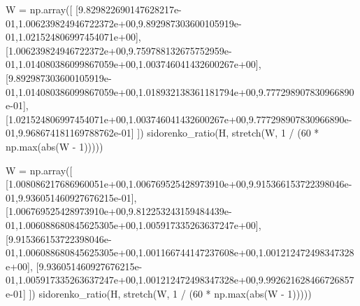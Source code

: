 \documentclass[
  letterpaper,
  DIV=11,
  numbers=noendperiod]{scrartcl}
\newenvironment{Shaded}{\begin{snugshade}}{\end{snugshade}}
\newcommand{\BuiltInTok}[1]{\textcolor[rgb]{0.00,0.23,0.31}{#1}}
\newcommand{\DecValTok}[1]{\textcolor[rgb]{0.68,0.00,0.00}{#1}}
\newcommand{\FloatTok}[1]{\textcolor[rgb]{0.68,0.00,0.00}{#1}}
\newcommand{\NormalTok}[1]{\textcolor[rgb]{0.00,0.23,0.31}{#1}}
\newcommand{\OperatorTok}[1]{\textcolor[rgb]{0.37,0.37,0.37}{#1}}
\begin{document}
\begin{Shaded}
\begin{Highlighting}[]
\NormalTok{W }\OperatorTok{=}\NormalTok{ np.array([}
\NormalTok{  [}\FloatTok{9.829822690147628217e{-}01}\NormalTok{,}\FloatTok{1.006239824946722372e+00}\NormalTok{,}\FloatTok{9.892987303600105919e{-}01}\NormalTok{,}\FloatTok{1.021524806997454071e+00}\NormalTok{],}
\NormalTok{[}\FloatTok{1.006239824946722372e+00}\NormalTok{,}\FloatTok{9.759788132675752959e{-}01}\NormalTok{,}\FloatTok{1.014080386099867059e+00}\NormalTok{,}\FloatTok{1.003746041432600267e+00}\NormalTok{],}
\NormalTok{[}\FloatTok{9.892987303600105919e{-}01}\NormalTok{,}\FloatTok{1.014080386099867059e+00}\NormalTok{,}\FloatTok{1.018932138361181794e+00}\NormalTok{,}\FloatTok{9.777298907830966890e{-}01}\NormalTok{],}
\NormalTok{[}\FloatTok{1.021524806997454071e+00}\NormalTok{,}\FloatTok{1.003746041432600267e+00}\NormalTok{,}\FloatTok{9.777298907830966890e{-}01}\NormalTok{,}\FloatTok{9.968674181169788762e{-}01}\NormalTok{]}
\NormalTok{])}
\NormalTok{sidorenko\_ratio(H, stretch(W, }\DecValTok{1} \OperatorTok{/}\NormalTok{ (}\DecValTok{60} \OperatorTok{*}\NormalTok{ np.}\BuiltInTok{max}\NormalTok{(}\BuiltInTok{abs}\NormalTok{(W }\OperatorTok{{-}} \DecValTok{1}\NormalTok{)))))}

\NormalTok{W }\OperatorTok{=}\NormalTok{ np.array([}
\NormalTok{[}\FloatTok{1.008086217686960051e+00}\NormalTok{,}\FloatTok{1.006769525428973910e+00}\NormalTok{,}\FloatTok{9.915366153722398046e{-}01}\NormalTok{,}\FloatTok{9.936051460927676215e{-}01}\NormalTok{],}
\NormalTok{[}\FloatTok{1.006769525428973910e+00}\NormalTok{,}\FloatTok{9.812253243159484439e{-}01}\NormalTok{,}\FloatTok{1.006088680845625305e+00}\NormalTok{,}\FloatTok{1.005917335263637247e+00}\NormalTok{],}
\NormalTok{[}\FloatTok{9.915366153722398046e{-}01}\NormalTok{,}\FloatTok{1.006088680845625305e+00}\NormalTok{,}\FloatTok{1.001166744147237608e+00}\NormalTok{,}\FloatTok{1.001212472498347328e+00}\NormalTok{],}
\NormalTok{[}\FloatTok{9.936051460927676215e{-}01}\NormalTok{,}\FloatTok{1.005917335263637247e+00}\NormalTok{,}\FloatTok{1.001212472498347328e+00}\NormalTok{,}\FloatTok{9.992621628466726857e{-}01}\NormalTok{]}
\NormalTok{])}
\NormalTok{sidorenko\_ratio(H, stretch(W, }\DecValTok{1} \OperatorTok{/}\NormalTok{ (}\DecValTok{60} \OperatorTok{*}\NormalTok{ np.}\BuiltInTok{max}\NormalTok{(}\BuiltInTok{abs}\NormalTok{(W }\OperatorTok{{-}} \DecValTok{1}\NormalTok{)))))}


\end{Highlighting}
\end{Shaded}
\end{document}
